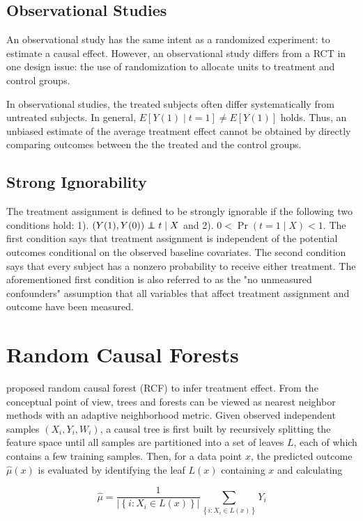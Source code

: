 \documentclass{article}
\newcommand\independent{\protect\mathpalette{\protect\independenT}{\perp}}
\def\independenT#1#2{\mathrel{\rlap{$#1#2$}\mkern2mu{#1#2}}}
\begin{document}
\subsection{Observational Studies}
An observational study has the same intent as a randomized experiment:
to estimate a causal effect. However, an observational study differs
from a RCT in one design issue: the use of randomization to allocate
units to treatment and control groups.

In observational studies, the treated subjects often differ
systematically from untreated subjects. In general, $E[Y(1)\mid t=1]
\neq E[Y(1)]$ holds. Thus, an unbiased estimate of the average
treatment effect cannot be obtained by directly comparing outcomes
between the the treated and the control groups.

\subsection{Strong Ignorability}
The treatment assignment is defined to be strongly ignorable
\cite{rosenbaum1983central} if the following two conditions hold: 1).
$(Y(1), Y(0)) \independent t\mid X$ and 2). $0 < \Pr (t=1 \mid X) <
1$. The first condition says that treatment assignment is independent
of the potential outcomes conditional on the observed baseline
covariates. The second condition says that every subject has a nonzero
probability to receive either treatment. The aforementioned first
condition is also referred to as the "no unmeasured confounders"
assumption that all variables that affect treatment assignment and
outcome have been measured.
\section{Random Causal Forests}
\cite{wager2015estimation} proposed random causal forest (RCF) to
infer treatment effect. From the conceptual point of view, trees and forests can be viewed as
nearest neighbor methods with an adaptive neighborhood metric. Given
observed independent samples $(X_i, Y_i, W_i)$, a causal tree is first
built by recursively splitting the feature space until all samples are
partitioned into a set of leaves $L$, each of which contains a few
training samples. Then, for a data point $x$, the predicted outcome $\hat{\mu}(x)$
is evaluated by identifying the leaf $L(x)$ containing $x$ and
calculating

$$\hat{\mu} = \frac{1}{\left | \left \{ i: X_i \in L(x) \right \}
  \right |} \sum_{\left \{ i: X_i \in L(x) \right \}} Y_i$$
\end{document}
